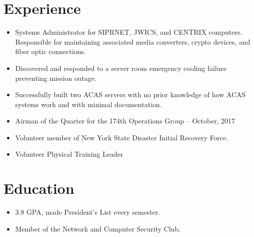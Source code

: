 \documentclass[11pt]{resume}
\author{Seth P. Sevier}
\begin{document}
\maketitle
\smallskip

\section{Experience}

\begin{itemize}
\item Systems Administrator for SIPRNET, JWICS, and CENTRIX computers.  Responsible for maintaining associated media converters, crypto devices, and fiber optic connections.
\item Discovered and responded to a server room emergency cooling failure preventing mission outage.
\item Successfully built two ACAS servers with no prior knowledge of how ACAS systems work and with minimal documentation.
\item Airman of the Quarter for the 174th Operations Group -- October, 2017
\item Volunteer member of New York State Disaster Initial Recovery Force.
\item Volunteer Physical Training Leader
\end{itemize}

\section{Education}
\begin{itemize}
\item 3.8 GPA, made President's List every semester.
\item Member of the Network and Computer Security Club.
\end{itemize}


\end{document}
